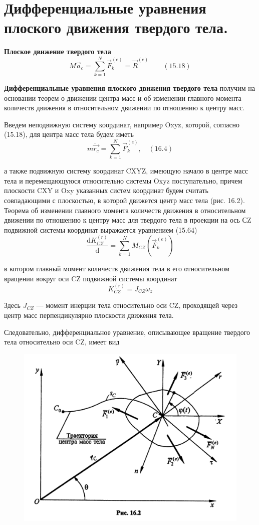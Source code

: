 {\begin{center}
\end{center}
\section{Дифференциальные уравнения плоского движения твердого тела.}
\begin{center}
    \par \textbf{Плоское движение твердого тела}
        $$M \vec a_{c} = \sum_{k=1}^N \vec F_{k}^{(e)} = \vec R^{(e)} \qquad (15.18)$$
    \par \textbf{Дифференциальные уравнения плоского движения твердого тела} получим на основании теорем о движении центра масс и об изменении главного момента количеств движения в относительном движении по отношению к центру масс. 
    \par Введем неподвижную систему координат, например Oxyz, которой, согласно (15.18), для центра масс тела будем иметь
        $$m \ddot{\vec{r_{c}}} = \sum_{k=1}^{N} \vec{F}_{k}^{(e)}, \quad (16.4)$$
    \par а также подвижную систему координат CXYZ, имеющую начало в центре масс тела и перемещающуюся относительно системы Oxyz поступательно, причем плоскости CXY и Oxy указанных систем координат будем считать совпадающими с плоскостью, в которой движется центр масс тела (рис. 16.2). Теорема об изменении главного момента количеств движения в относительном движении по отношению к центру масс для твердого тела в проекции на ось СZ подвижной системы координат выражается уравнением (15.64)
        $$\frac{\mathrm{d}K_{CZ}^{(r)}}{\mathrm{d}} = \sum_{k=1}^{N} M_{CZ}(\vec F_{k}^{(e)}) $$
    \par в котором главный момент количеств движения тела в его относительном вращении вокруг оси  CZ  подвижной системы координат
        $$K_{CZ}^{(r)} = J_{CZ}\omega_z$$
    \par Здесь  $J_{CZ}$ — момент инерции тела относительно оси CZ, проходящей через центр масс перпендикулярно плоскости движения тела.
    \par Следовательно, дифференциальное уравнение, описывающее вращение твердого тела относительно оси CZ, имеет вид
    \begin{figure}[H]
        \centering\includegraphics[scale=0.4]{img/16.2.jpeg} 

\end{figure}
\end{center}}
